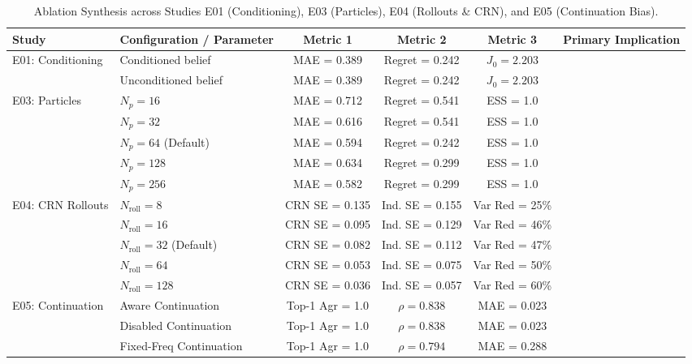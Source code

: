 \begin{table}[t]
\centering
\small
\caption{Ablation Synthesis across Studies E01 (Conditioning), E03 (Particles), E04 (Rollouts \& CRN), and E05 (Continuation Bias).}
\label{tab:ablations}
\begin{tabular}{llcccc}
\toprule
Study & Configuration / Parameter & Metric 1 & Metric 2 & Metric 3 & Primary Implication \\
\midrule
E01: Conditioning & Conditioned belief & MAE = 0.389 & Regret = 0.242 & $J_0 = 2.203$ &  \\
                  & Unconditioned belief & MAE = 0.389 & Regret = 0.242 & $J_0 = 2.203$ & \\
\midrule
E03: Particles    & $N_p = 16$  & MAE = 0.712 & Regret = 0.541 & ESS = 1.0 &  \\
                  & $N_p = 32$  & MAE = 0.616 & Regret = 0.541 & ESS = 1.0 & \\
                  & $N_p = 64$ (Default) & MAE = 0.594 & Regret = 0.242 & ESS = 1.0 & \\
                  & $N_p = 128$ & MAE = 0.634 & Regret = 0.299 & ESS = 1.0 & \\
                  & $N_p = 256$ & MAE = 0.582 & Regret = 0.299 & ESS = 1.0 & \\
\midrule
E04: CRN Rollouts & $N_{\mathrm{roll}} = 8$  & CRN SE = 0.135 & Ind. SE = 0.155 & Var Red = 25\% &  \\
                  & $N_{\mathrm{roll}} = 16$ & CRN SE = 0.095 & Ind. SE = 0.129 & Var Red = 46\% & \\
                  & $N_{\mathrm{roll}} = 32$ (Default) & CRN SE = 0.082 & Ind. SE = 0.112 & Var Red = 47\% & \\
                  & $N_{\mathrm{roll}} = 64$ & CRN SE = 0.053 & Ind. SE = 0.075 & Var Red = 50\% & \\
                  & $N_{\mathrm{roll}} = 128$& CRN SE = 0.036 & Ind. SE = 0.057 & Var Red = 60\% & \\
\midrule
E05: Continuation & Aware Continuation & Top-1 Agr = 1.0 & $\rho = 0.838$ & MAE = 0.023 &  \\
                  & Disabled Continuation & Top-1 Agr = 1.0 & $\rho = 0.838$ & MAE = 0.023 & \\
                  & Fixed-Freq Continuation & Top-1 Agr = 1.0 & $\rho = 0.794$ & MAE = 0.288 & \\
\bottomrule
\end{tabular}
\end{table}
